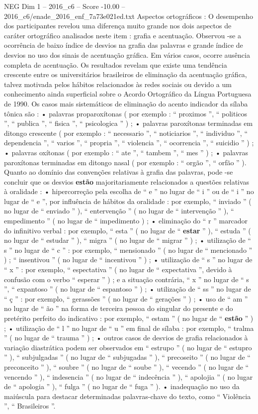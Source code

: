 \begin{textsample}{NEG Dim 1 – 2016\_c6 – Score -10.00 – 2016\_c6/enade\_2016\_enf\_7a73e021ed.txt}
Aspectos ortográficos : O desempenho dos participantes revelou uma diferença muito grande nos dois aspectos de caráter ortográfico analisados neste item : grafia e acentuação.
Observou -se a ocorrência de baixo índice de desvios na grafia das palavras e grande índice de desvios no uso dos sinais de acentuação gráfica.
Em vários casos, ocorre ausência completa de acentuação.
Os resultados revelam que existe uma tendência crescente entre os universitários brasileiros de eliminação da acentuação gráfica, talvez motivada pelos hábitos relacionados às redes sociais ou devido a um conhecimento ainda superficial sobre o Acordo Ortográfico da Língua Portuguesa de 1990.
Os casos mais sistemáticos de eliminação do acento indicador da sílaba tônica são : • palavras proparoxítonas ( por exemplo : “ proximos ”, “ politicos ”, “ publica ”, “ fisica ”, “ psicologica ” ) ; • palavras paroxítonas terminadas em ditongo crescente ( por exemplo : “ necessario ”, “ noticiarios ”, “ individuo ”, “ dependencia ”, “ varios ”, “ propria ”, “ violencia ”, “ ocorrencia ”, “ suicidio ” ) ; • palavras oxítonas ( por exemplo : “ ate ”, “ tambem ”, “ mes ” ) ; • palavras paroxítonas terminadas em ditongo nasal ( por exemplo : “ orgão ”, “ orfão ” ).
Quanto ao domínio das convenções relativas à grafia das palavras, pode -se concluir que os desvios \textbf{estão} majoritariamente relacionados a questões relativas à oralidade : • hipercorreção pela escolha de “ e ” no lugar de “ i ” ou de “ i ” no lugar de “ e ”, por influência de hábitos da oralidade : por exemplo, “ inviado ” ( no lugar de “ enviado ” ), “ entervenção ” ( no lugar de “ intervenção ” ), “ empedimento ” ( no lugar de “ impedimento ) ; • eliminação do “ r ” marcador do infinitivo verbal : por exemplo, “ esta ” ( no lugar de “ \textbf{estar} ” ), “ estuda ” ( no lugar de “ estudar ” ), “ migra ” ( no lugar de “ migrar ” ) ; • utilização de “ s ” no lugar de “ c ” : por exemplo, “ mensionado ” ( no lugar de “ mencionado ” ) ; “ insentivou ” ( no lugar de “ incentivou ” ) ; • utilização de “ s ” no lugar de “ x ” : por exemplo, “ espectativa ” ( no lugar de “ expectativa ”, devido à confusão com o verbo “ esperar ” ) ; e a situação contrária, “ x ” no lugar de “ s ”, “ expantoso ” ( no lugar de “ espantoso ” ) ; • utilização de “ ss ” no lugar de “ ç ” : por exemplo, “ gerassões ” ( no lugar de “ gerações ” ) ; • uso de “ am ” no lugar de “ ão ” na forma de terceira pessoa do singular do presente e do pretérito perfeito do indicativo : por exemplo, “ estam ” ( no lugar de “ \textbf{estão} ” ) ; • utilização de “ l ” no lugar de “ u ” em final de sílaba : por exemplo, “ tralma ” ( no lugar de “ trauma ” ) ; • outros casos de desvios de grafia relacionados à variação diastrática podem ser observados em “ estrupo ” ( no lugar de “ estupro ” ), “ subjulgadas ” ( no lugar de “ subjugadas ” ), “ precoseito ” ( no lugar de “ preconceito ” ), “ soubre ” ( no lugar de “ soube ” ), “ vecendo ” ( no lugar de “ vencendo ” ), “ indesencia ” ( no lugar de “ indecência ” ), “ apolojia ” ( no lugar de “ apologia ” ), “ fulga ” ( no lugar de “ fuga ” ). • inadequação no uso da maiúscula para destacar determinadas palavras-chave do texto, como “ Violência ”, “ Brasileiros ”.

\end{textsample}

